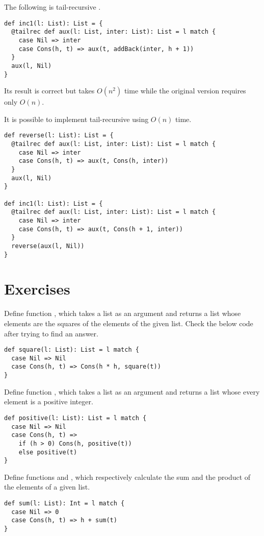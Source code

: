 The following is tail-recursive .

\begin{verbatim}
def inc1(l: List): List = {
  @tailrec def aux(l: List, inter: List): List = l match {
    case Nil => inter
    case Cons(h, t) => aux(t, addBack(inter, h + 1))
  }
  aux(l, Nil)
}
\end{verbatim}

Its result is correct but takes \(O(n^2)\) time while the original version
requires only \(O(n)\).

It is possible to implement tail-recursive  using \(O(n)\) time.

\begin{verbatim}
def reverse(l: List): List = {
  @tailrec def aux(l: List, inter: List): List = l match {
    case Nil => inter
    case Cons(h, t) => aux(t, Cons(h, inter))
  }
  aux(l, Nil)
}

def inc1(l: List): List = {
  @tailrec def aux(l: List, inter: List): List = l match {
    case Nil => inter
    case Cons(h, t) => aux(t, Cons(h + 1, inter))
  }
  reverse(aux(l, Nil))
}
\end{verbatim}

\section{Exercises}

Define function , which takes a list as an argument and returns a
list whose elements are the squares of the elements of the given list. Check the
below code after trying to find an answer.

\begin{verbatim}
def square(l: List): List = l match {
  case Nil => Nil
  case Cons(h, t) => Cons(h * h, square(t))
}
\end{verbatim}

Define function , which takes a list as an argument and returns a
list whose every element is a positive integer.

\begin{verbatim}
def positive(l: List): List = l match {
  case Nil => Nil
  case Cons(h, t) =>
    if (h > 0) Cons(h, positive(t))
    else positive(t)
}
\end{verbatim}

Define functions  and , which respectively calculate the
sum and the product of the elements of a given list.

\begin{verbatim}
def sum(l: List): Int = l match {
  case Nil => 0
  case Cons(h, t) => h + sum(t)
}
\end{verbatim}

